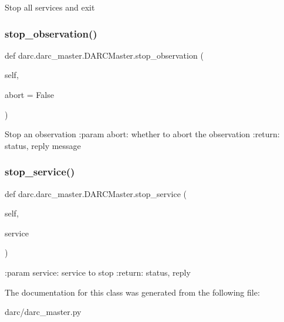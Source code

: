 \begin{DoxyVerb}Stop all services and exit
\end{DoxyVerb}
 \mbox{\label{classdarc_1_1darc__master_1_1_d_a_r_c_master_aba7fbc36f7f40f0357019c693c413c0f}} 
\subsubsection{\texorpdfstring{stop\_observation()}{stop\_observation()}}
{\footnotesize\ttfamily def darc.\+darc\+\_\+master.\+D\+A\+R\+C\+Master.\+stop\+\_\+observation (\begin{DoxyParamCaption}\item[{}]{self,  }\item[{}]{abort = {\ttfamily False} }\end{DoxyParamCaption})}

\begin{DoxyVerb}Stop an observation
:param abort: whether to abort the observation
:return: status, reply message
\end{DoxyVerb}
 \mbox{\label{classdarc_1_1darc__master_1_1_d_a_r_c_master_aa908ae91dc2c239806d2c6555f630395}} 
\subsubsection{\texorpdfstring{stop\_service()}{stop\_service()}}
{\footnotesize\ttfamily def darc.\+darc\+\_\+master.\+D\+A\+R\+C\+Master.\+stop\+\_\+service (\begin{DoxyParamCaption}\item[{}]{self,  }\item[{}]{service }\end{DoxyParamCaption})}

\begin{DoxyVerb}:param service: service to stop
:return: status, reply
\end{DoxyVerb}
 

The documentation for this class was generated from the following file\+:\begin{DoxyCompactItemize}
\item 
darc/darc\+\_\+master.\+py\end{DoxyCompactItemize}
